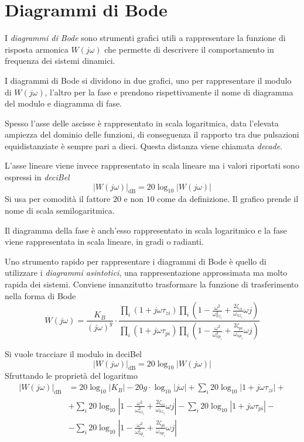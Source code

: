 
\section{Diagrammi di Bode}
I \textit{diagrammi di Bode} sono strumenti grafici utili a rappresentare la
funzione di risposta armonica $W(j\omega)$ che permette di descrivere il
comportamento in frequenza dei sistemi dinamici.

I diagrammi di Bode si dividono in due grafici, uno per rappresentare il modulo
di $W(j\omega)$, l'altro per la fase e prendono rispettivamente il nome di
diagramma del modulo e diagramma di fase.

Spesso l'asse delle ascisse è rappresentato in scala logaritmica, data
l'elevata ampiezza del dominio delle funzioni, di conseguenza il rapporto tra
due pulsazioni equidistanziate è sempre pari a dieci.
Questa distanza viene chiamata \textit{decade}.

L'asse lineare viene invece rappresentato in scala lineare ma i valori
riportati sono espressi in \textit{deciBel}
$$
|W(j\omega)|_{\si{\deci\bel}} = 20\log_{10}|W(j\omega)|
$$
Si usa per comodità il fattore $20$ e non $10$ come da definizione.
Il grafico prende il nome di scala semilogaritmica.
\begin{figure}[h]
\centering
{}
\end{figure}

Il diagramma della fase è anch'esso rappresentato in scala logaritmico e la
fase viene rappresentata in scala lineare, in gradi o radianti.

Uno strumento rapido per rappresentare i diagrammi di Bode è quello di
utilizzare i \textit{diagrammi asintotici}, una rappresentazione approssimata
ma molto rapida dei sistemi.
Conviene innanzitutto trasformare la funzione di trasferimento nella forma di
Bode
$$
W(j\omega) = \frac{K_B}{(j\omega)^g}\cdot \frac{\prod_i (1+j\omega
\tau_{zi})
\prod_i \left(1-\frac{\omega^2}{\omega_{nz_i}^2} +
\frac{2\zeta_{zi}}{\omega_{nz_i}}\omega j\right) }
{\prod_i (1+j\omega \tau_{pi})
\prod_i \left(1-\frac{\omega^2}{\omega_{np_i}^2} +
\frac{2\zeta_{pi}}{\omega_{np_i}}\omega j\right) }
$$

Si vuole tracciare il modulo in deciBel
$$
|W(j\omega)|_{\si{\deci\bel}} = 20\log_{10}|W(j\omega)|
$$
Sfruttando le proprietà del logaritmo
$$\begin{aligned}
|W(j\omega)|_{\si{\deci\bel}} &= 20\log_{10}|K_B|-20g\cdot\log_{10}|j\omega| +
\sum_i 20\log_{10}|1+j\omega\tau_{zi}| + \\
&+\sum_i 20 \log_{10}
\left|1-\frac{\omega^2}{\omega_{nz_i}^2} +
\frac{2\zeta_{zi}}{\omega_{nz_i}}\omega j\right|
- \sum_i 20\log_{10}|1+j\omega\tau_{pi}| -\\
&-\sum_i 20 \log_{10}
\left|1-\frac{\omega^2}{\omega_{np_i}^2} +
\frac{2\zeta_{pi}}{\omega_{np_i}}\omega j\right|
\end{aligned}$$

